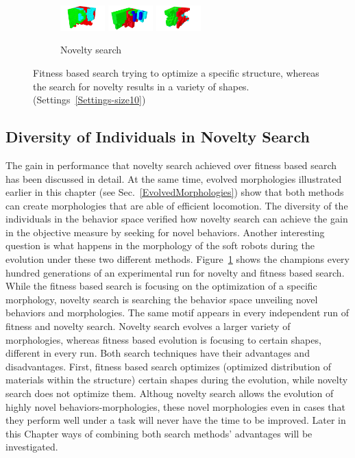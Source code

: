 \begin{figure}[t!]
\begin{subfigure}[b]{1.0\textwidth}
\includegraphics[width=0.19\textwidth]{../Figures/Robots/n_4_g_800.jpg}
\includegraphics[width=0.19\textwidth]{../Figures/Robots/n_4_g_900.jpg}
\includegraphics[width=0.19\textwidth]{../Figures/Robots/n_4_g_1000.jpg}
\caption{Novelty search}
\end{subfigure}
\caption{Fitness based search trying to optimize a specific structure, whereas the search for novelty results in a variety of shapes. (Settings~\ref{Settings-size10})}
\label{fig:morphologies}
\end{figure}


\subsection{Diversity of Individuals in Novelty Search}

The gain in performance that novelty search achieved over fitness based search has been discussed in detail.  At the same time, evolved morphologies illustrated earlier in this chapter (see Sec.~\ref{EvolvedMorphologies}) show that both methods can create morphologies that are able of efficient locomotion. The diversity of the individuals in the behavior space verified how novelty search can achieve the gain in the objective measure by seeking for novel behaviors. Another interesting question is what happens in the morphology of the soft robots during the evolution under these two different methods. Figure~\ref{fig:morphologies} shows the champions every hundred generations of an experimental run for novelty and fitness based search. While the fitness based search is focusing on the optimization of a specific morphology, novelty search is searching the behavior space unveiling novel behaviors and morphologies. The same motif appears in every independent run of fitness and novelty search. Novelty search evolves a larger variety of morphologies, whereas fitness based evolution is focusing to certain shapes, different in every run. Both search techniques have their advantages and disadvantages. First, fitness based search optimizes (optimized distribution of materials within the structure) certain shapes during the evolution, while novelty search does not optimize them. Althoug novelty search allows the evolution of highly novel behaviors-morphologies, these novel morphologies even in cases that they perform well under a task will never have the time to be improved. Later in this Chapter ways of combining both search methods' advantages will be investigated.

